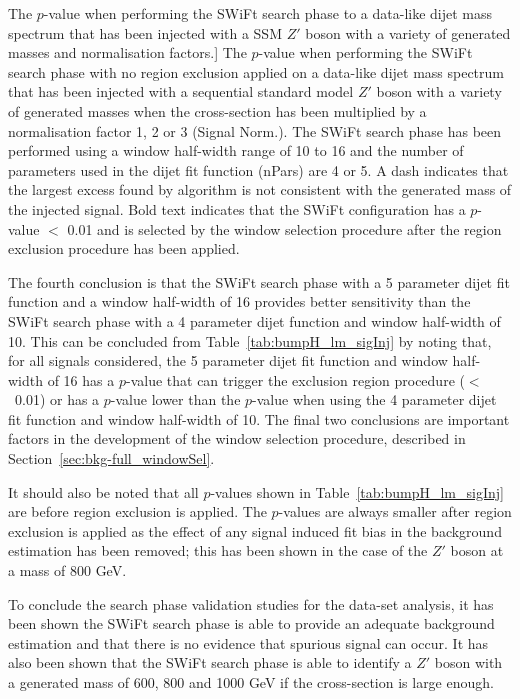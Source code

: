 \begin{table}[!hb]
\caption
    [The  \bh{} \mbox{$p$-value} when performing the SWiFt search phase to
      a data-like dijet mass spectrum that has been injected with a SSM $Z'$ boson with
      a variety of generated masses and normalisation factors.]
    {\label{tab:bumpH_lm_sigInj}
      The  \bh{} \mbox{$p$-value} when performing the SWiFt search phase with no region exclusion applied
      on a data-like dijet mass spectrum that has been injected with a sequential standard model $Z'$ boson with
      a variety of generated masses when the cross-section has been multiplied by a normalisation factor 1, 2 or 3 (Signal Norm.).
      The SWiFt search phase has been performed using a window half-width range of 10 to 16
      and the number of parameters used in the dijet fit function (nPars) are 4 or 5.
      A dash indicates that the largest excess found by \bh{} algorithm is not consistent with the generated mass of the injected signal.
      Bold text indicates that the SWiFt configuration has a \bh{} $p$-value $<$ 0.01
      and is selected by the window selection procedure after the region exclusion procedure has been applied. }
\end{table}

\newpage
The fourth conclusion is that the SWiFt search phase
with a 5 parameter dijet fit function and a window half-width of 16 provides better sensitivity
than the SWiFt search phase with a 4 parameter dijet function and window half-width of 10.
This can be concluded from Table~\ref{tab:bumpH_lm_sigInj} by noting that,
for all signals considered,
the 5 parameter dijet fit function and window half-width of 16
has a $p$-value that can trigger the exclusion region procedure (\mbox{$<$ 0.01})
or has a $p$-value lower than the $p$-value when using the 4 parameter dijet fit function and window half-width of 10. 
The final two conclusions are important factors in the development of the window selection procedure, described in Section~\ref{sec:bkg-full_windowSel}.

It should also be noted that all \bh{} $p$-values shown in Table~\ref{tab:bumpH_lm_sigInj} are before region exclusion is applied.
The \bh{} \mbox{$p$-value}s are always smaller after region exclusion is applied
as the effect of any signal induced fit bias in the background estimation has been removed;
this has been shown in the case of the $Z'$ boson at a mass of 800 GeV.

To conclude the search phase validation studies for the \lm{} data-set analysis,
it has been shown the SWiFt search phase is
able to provide an adequate background estimation 
and that there is no evidence that spurious signal can occur.
It has also been shown that 
the SWiFt search phase is able to identify a
$Z'$ boson with a generated mass of 600, 800 and 1000 GeV if the cross-section is large enough.

